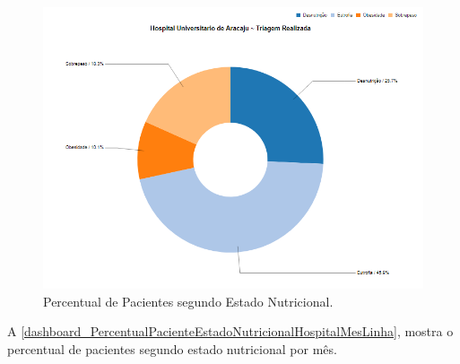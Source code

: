\begin{figure}[htb]
	\caption{\label{dashboard_PercentualPacienteEstadoNutricionalHospitalAnoPizza}Percentual de Pacientes segundo Estado Nutricional.}
	\begin{center}
	    \includegraphics[scale=0.6]{Imagens/3.1.PercentualPacienteEstadoNutricionalHospitalAnoPizza.png}
	\end{center}
\end{figure}

\newpage
A \autoref{dashboard_PercentualPacienteEstadoNutricionalHospitalMesLinha}, mostra o percentual de pacientes segundo estado nutricional por mês.

